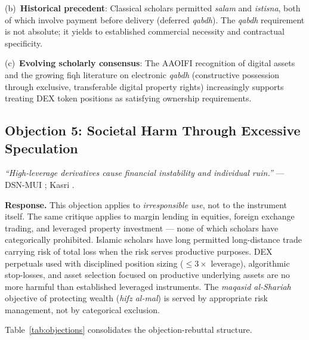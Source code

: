 \documentclass[10pt,twocolumn]{article}
\begin{document}
(b)~\textbf{Historical precedent}: Classical scholars permitted \textit{salam}
and \textit{istisna}, both of which involve payment before delivery (deferred
\textit{qabdh}). The \textit{qabdh} requirement is not absolute; it yields to
established commercial necessity and contractual specificity.

(c)~\textbf{Evolving scholarly consensus}: The AAOIFI recognition of digital
assets \cite{AAOIFI2015} and the growing fiqh literature on electronic
\textit{qabdh} (constructive possession through exclusive, transferable digital
property rights) increasingly supports treating DEX token positions as
satisfying ownership requirements.

\subsection{Objection 5: Societal Harm Through Excessive Speculation}

\emph{``High-leverage derivatives cause financial instability and individual
ruin.''} --- DSN-MUI \cite{DSNMUI2021}; Kasri \cite{Kasri2016}.

\textbf{Response.} This objection applies to \emph{irresponsible use}, not to
the instrument itself. The same critique applies to margin lending in equities,
foreign exchange trading, and leveraged property investment --- none of which
scholars have categorically prohibited. Islamic scholars have long permitted
long-distance trade carrying risk of total loss when the risk serves productive
purposes. DEX perpetuals used with disciplined position sizing ($\leq 3\times$
leverage), algorithmic stop-losses, and asset selection focused on productive
underlying assets are no more harmful than established leveraged instruments.
The \textit{maqasid al-Shariah} objective of protecting wealth (\textit{hifz
al-mal}) is served by appropriate risk management, not by categorical exclusion.

Table~\ref{tab:objections} consolidates the objection-rebuttal structure.
\end{document}
